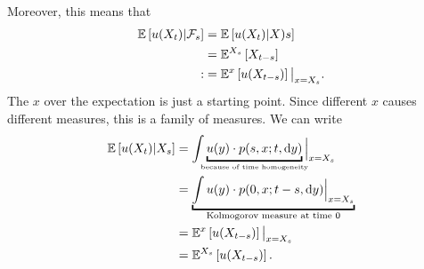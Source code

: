 Moreover, this means that
\begin{align*}
	\mathbb{E}\left[{u(X_t)|\mathcal{F}_s}\right]&=\mathbb{E}\left[{u(X_t)|X)s}\right]\\
	&=\mathbb{E}^{X_s}\left[X_{t-s}\right]\\
	:&=\mathbb{E}^{x}\left[u(X_{t-s})\right]\big|_{x=X_{s}}.
\end{align*}
The $x$ over the expectation is just a starting point. Since different $x$ causes different measures, this is a family of measures. We can write
\begin{align*}
	\ev{u(X_{t})|X_s}&=\int \underbracket{u(y)\cdot p(s,x;t,\dif y)}_{\mathclap{\text{\tiny because of time homogeneity}}}\Big|_{x=X_s}\\
	&=\underbracket{\int u(y)\cdot p(0,x;t-s,\dif y)\Big|_{x=X_s}}_{\mathclap{\text{Kolmogorov measure at time }0}}\\
	&=\mE^{x}\left[u(X_{t-s})\right]\big|_{x=X_s}\\
	&=\mE^{X_{s}}\left[u(X_{t-s})\right].
\end{align*}

